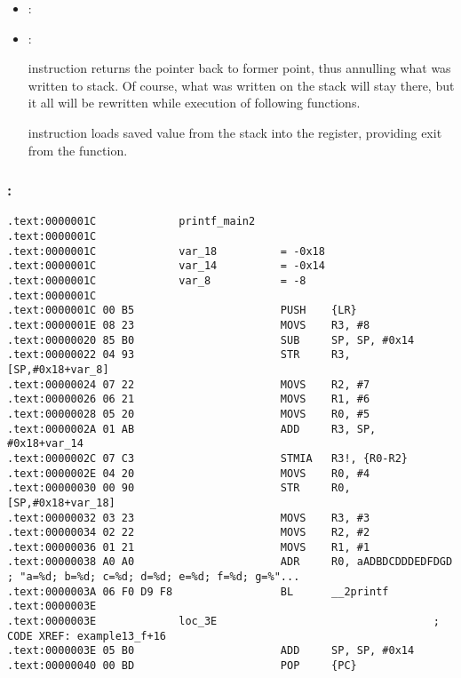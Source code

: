 \begin{itemize}
\item {}:

\item {}:

 
{instruction returns the \SP pointer back to former point,
thus annulling what was written to stack}.
{Of course, what was written on the stack will stay there, but it all will be
rewritten while execution of following functions}.

 
{instruction loads saved \LR value from the stack into the \PC register, providing
exit from the function}.

\end{itemize}

\subsubsection{\OptimizingKeil: \ThumbMode}

\begin{lstlisting}
.text:0000001C             printf_main2
.text:0000001C
.text:0000001C             var_18          = -0x18
.text:0000001C             var_14          = -0x14
.text:0000001C             var_8           = -8
.text:0000001C
.text:0000001C 00 B5                       PUSH    {LR}
.text:0000001E 08 23                       MOVS    R3, #8
.text:00000020 85 B0                       SUB     SP, SP, #0x14
.text:00000022 04 93                       STR     R3, [SP,#0x18+var_8]
.text:00000024 07 22                       MOVS    R2, #7
.text:00000026 06 21                       MOVS    R1, #6
.text:00000028 05 20                       MOVS    R0, #5
.text:0000002A 01 AB                       ADD     R3, SP, #0x18+var_14
.text:0000002C 07 C3                       STMIA   R3!, {R0-R2}
.text:0000002E 04 20                       MOVS    R0, #4
.text:00000030 00 90                       STR     R0, [SP,#0x18+var_18]
.text:00000032 03 23                       MOVS    R3, #3
.text:00000034 02 22                       MOVS    R2, #2
.text:00000036 01 21                       MOVS    R1, #1
.text:00000038 A0 A0                       ADR     R0, aADBDCDDDEDFDGD ; "a=%d; b=%d; c=%d; d=%d; e=%d; f=%d; g=%"...
.text:0000003A 06 F0 D9 F8                 BL      __2printf
.text:0000003E
.text:0000003E             loc_3E                                  ; CODE XREF: example13_f+16
.text:0000003E 05 B0                       ADD     SP, SP, #0x14
.text:00000040 00 BD                       POP     {PC}
\end{lstlisting}

